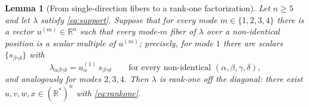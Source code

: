 \documentclass[12pt]{article}
\newcommand{\bR}{\mathbb{R}}
\newtheorem{lemma}{Lemma}
\theoremstyle{definition}
\begin{document}
\begin{lemma}[From single-direction fibers to a rank-one factorization]\label{lem:combinatorial}
Let $n\ge5$ and let $\lambda$ satisfy \eqref{eq:support}.  Suppose that for every
mode $m\in\{1,2,3,4\}$ there is a vector $u^{(m)}\in\bR^n$ such that every
mode-$m$ fiber of $\lambda$ over a non-identical position is a scalar multiple of
$u^{(m)}$; precisely, for mode $1$ there are scalars
$\{s_{\beta\gamma\delta}\}$ with
\begin{equation}\label{eq:mode1factor}
\lambda_{\alpha\beta\gamma\delta}=u^{(1)}_\alpha\,s_{\beta\gamma\delta}
\qquad\text{for every non-identical }(\alpha,\beta,\gamma,\delta),
\end{equation}
and analogously for modes $2,3,4$.  Then $\lambda$ is rank-one off the diagonal:
there exist $u,v,w,x\in(\bR^*)^n$ with \eqref{eq:rankone}.
\end{lemma}
\end{document}

